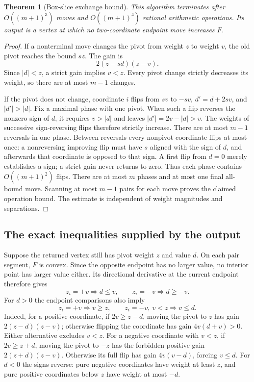 \documentclass[11pt,a4paper]{article}
\newtheorem{theorem}{Theorem}
\begin{document}
\begin{theorem}[Box-slice exchange bound]\label{thm:exchange}
This algorithm terminates after $O((m+1)^3)$ moves and
$O((m+1)^4)$ rational arithmetic operations. Its output is a vertex at
which no two-coordinate endpoint move increases $F$.
\end{theorem}
\begin{proof}
If a nonterminal move changes the pivot from weight $z$ to weight $v$,
the old pivot reaches the bound $sz$. The gain is
\[
 2(z-sd)(z-v).
\]
Since $|d|<z$, a strict gain implies $v<z$. Every pivot change strictly
decreases its weight, so there are at most $m-1$ changes.

If the pivot does not change, coordinate $i$ flips from $sv$ to $-sv$,
$d'=d+2sv$, and $|d'|>|d|$. Fix a maximal phase with one pivot.
When such a flip reverses the nonzero sign of $d$, it requires $v>|d|$
and leaves $|d'|=2v-|d|>v$. The weights of successive sign-reversing
flips therefore strictly increase. There are at most $m-1$ reversals in
one phase. Between reversals every nonpivot coordinate flips at most
once: a nonreversing improving flip must have $s$ aligned with the sign
of $d$, and afterwards that coordinate is opposed to that sign. A first
flip from $d=0$ merely establishes a sign; a strict gain never returns
to zero. Thus each phase contains $O((m+1)^2)$ flips.
There are at most $m$ phases and at most one final all-bound move.
Scanning at most $m-1$ pairs for each move proves the claimed operation
bound. The estimate is independent of weight magnitudes and separations.
\end{proof}

\subsection{The exact inequalities supplied by the output}
Suppose the returned vertex still has pivot weight $z$ and value $d$.
On each pair segment, $F$ is convex. Since the opposite endpoint has no
larger value, no interior point has larger value either. Its directional
derivative at the current endpoint therefore gives
\[
 z_i=+v\Rightarrow d\le v,\qquad
 z_i=-v\Rightarrow d\ge-v.                         \tag{B.1}
\]
For $d>0$ the endpoint comparisons also imply
\[
 z_i=+v\Rightarrow v\ge z,\qquad
 z_i=-v,\ v<z\Rightarrow v\le d.                  \tag{B.2}
\]
Indeed, for a positive coordinate, if $2v\ge z-d$, moving the pivot to
$z$ has gain $2(z-d)(z-v)$; otherwise flipping the coordinate has gain
$4v(d+v)>0$. Either alternative excludes $v<z$. For a negative coordinate
with $v<z$, if $2v\ge z+d$, moving the pivot to $-z$ has the forbidden
positive gain $2(z+d)(z-v)$. Otherwise its full flip has gain
$4v(v-d)$, forcing $v\le d$. For $d<0$ the signs reverse: pure negative
coordinates have weight at least $z$, and pure positive coordinates
below $z$ have weight at most $-d$.
\end{document}
